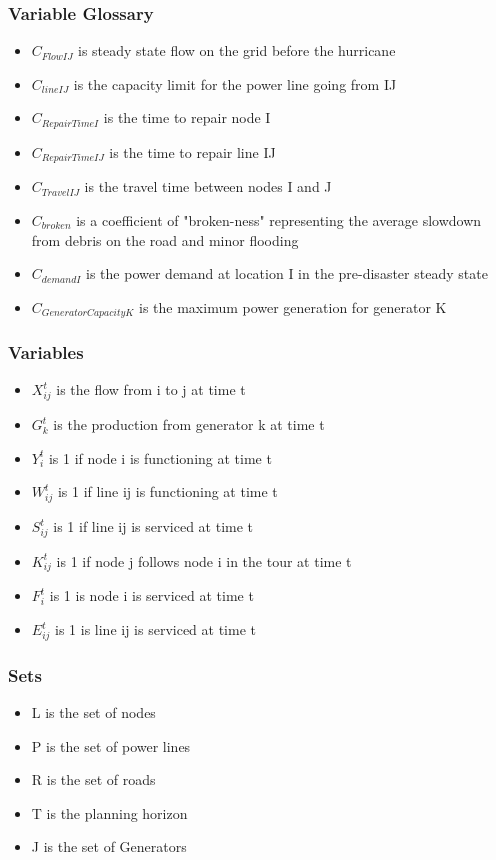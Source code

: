 \documentclass{article}
\begin{document}
	\subsubsection{Variable Glossary}
	\begin{itemize}
		\item $C_{FlowIJ}$ is steady state flow on the grid before the hurricane
		\item $C_{lineIJ}$ is the capacity limit for the power line going from IJ
		\item $C_{RepairTimeI}$ is the time to repair node I
		\item $C_{RepairTimeIJ}$ is the time to repair line IJ
		\item $C_{TravelIJ}$ is the travel time between nodes I and J
		\item $C_{broken}$ is a coefficient of "broken-ness" representing the average slowdown from debris on the road and minor flooding
		\item $C_{demandI}$ is the power demand at location I in the pre-disaster steady state
		\item $C_{GeneratorCapacityK}$ is the maximum power generation for generator K
	\end{itemize}
	\subsubsection{Variables}
	\begin{itemize}
		
		\item $X_{ij}^{t}$ is the flow from i to j at time t
		\item $G_{k}^t$ is the production from generator k at time t
		\item $Y_i^t$ is 1 if node i is functioning at time t
		\item $W_{ij}^t$ is 1 if line ij is functioning at time t
		\item $S_{ij}^t$ is 1 if line ij is serviced at time t
		\item $K_{ij}^t$ is 1 if node j follows node i in the tour at time t 
		\item $F_i^t$ is 1 is node i is serviced at time t 
		\item $E_{ij}^t$ is 1 is line ij is serviced at time t	
\end{itemize}
	\subsubsection{Sets}
	\begin{itemize}
		\item L is the set of nodes
		\item P is the set of power lines
		\item R is the set of roads
		\item T is the planning horizon
		\item J is the set of Generators
	\end{itemize}
\end{document}
